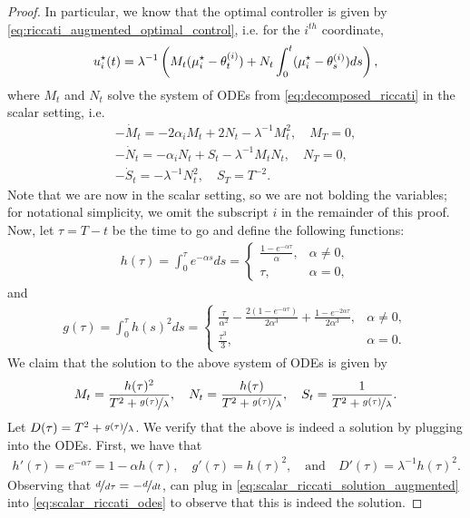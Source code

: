 \begin{proof}
    In particular, we know that the optimal controller is given by \eqref{eq:riccati_augmented_optimal_control}, i.e. for the $i^{th}$ coordinate, 
    \begin{align}
        u^{\star}_i(t) = \lambda^{-1} \left( M_t (\mu^{\star}_i - \theta_t^{(i)}) + N_t \int_0^t (\mu^{\star}_i - \theta_s^{(i)}) d s \right),
    \end{align}
    where $M_t$ and $N_t$ solve the system of ODEs from \eqref{eq:decomposed_riccati}  in the scalar setting, i.e.
    \begin{align}
        - \dot{M}_t = - 2 \alpha_i M_t + 2 N_t - \lambda^{-1} M_t^2, \quad M_T = 0, \\
        - \dot{N}_t = - \alpha_i N_t + S_t - \lambda^{-1} M_t N_t, \quad N_T = 0,\label{eq:scalar_riccati_odes} \\
        - \dot{S}_t = - \lambda^{-1} N_t^2, \quad S_T = T^{-2}.
    \end{align}
    Note that we are now in the scalar setting, so we are not bolding the variables; for notational simplicity, we omit the subscript $i$ in the remainder of this proof.  Now, let $\tau = T - t$ be the time to go and define the following functions:
    \begin{align}
        h(\tau) = \int_0^\tau e^{- \alpha s} d s = \begin{cases}
            \frac{1 - e^{- \alpha \tau}}{\alpha}, & \alpha \neq 0, \\
            \tau, & \alpha = 0,
        \end{cases}
    \end{align}
    and
    \begin{align}
        g(\tau) = \int_0^\tau h(s)^2 d s = \begin{cases}
            \frac{\tau}{\alpha^2} - \frac{2(1 - e^{- \alpha \tau})}{2\alpha^3} + \frac{1 - e^{- 2 \alpha \tau}}{2 \alpha^3}, & \alpha \neq 0, \\
            \frac{\tau^3}{3}, & \alpha = 0.
        \end{cases}
    \end{align}
    We claim that the solution to the above system of ODEs is given by
    \begin{align}\label{eq:scalar_riccati_solution_augmented}
        M_t = \frac{h(\tau)^2}{T^2 + \nicefrac{g(\tau)}{\lambda}}, \quad N_t = \frac{h(\tau)}{T^2 + \nicefrac{g(\tau)}{\lambda}}, \quad S_t = \frac{1}{T^2 + \nicefrac{g(\tau)}{\lambda}}.
    \end{align}
    Let $D(\tau) = T^2 + \nicefrac{g(\tau)}{\lambda}$.  We verify that the above is indeed a solution by plugging into the ODEs.  First, we have that
    \begin{align}
        h'(\tau) = e^{- \alpha \tau} = 1 - \alpha h(\tau), \quad g'(\tau) = h(\tau)^2, \quad \text{and} \quad D'(\tau) = \lambda^{-1} h(\tau)^2.
    \end{align}
    Observing that $\nicefrac{d}{d \tau} = - \nicefrac{d}{d t}$, can plug in \eqref{eq:scalar_riccati_solution_augmented} into \eqref{eq:scalar_riccati_odes} to observe that this is indeed the solution.


\end{proof}
